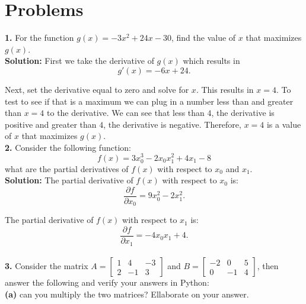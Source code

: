 \documentclass[a4paper]{article}
\begin{document}
\section{Problems}
\textbf{1.} For the function $g(x) = -3x^2 +24x -30$, find the value of $x$ that 
maximizes $g(x)$.\\

\textbf{Solution:} First we take the derivative of $g(x)$ which results in
\begin{equation*}
  g'(x) = -6x+24.
\end{equation*}

Next, set the derivative equal to zero and solve for $x$.  This results in $x=4$.  
To test to see if that is a maximum we can plug in a number less than and greater 
than $x=4$ to the derivative.  We can see that less than $4$, the derivative is positive 
and greater than $4$, the derivative is negative.  Therefore, $x=4$ is a value of $x$ 
that maximizes $g(x)$.\\
\textbf{2.} Consider the following function:
\begin{equation}
  f(x) = 3x_0^3 - 2x_0x_1^2 + 4x_1 - 8
\end{equation}
what are the partial derivatives of $f(x)$ with respect to $x_0$ and $x_1$.\\

\textbf{Solution:} The partial derivative of $f(x)$ with respect to $x_0$ is:
\begin{equation*}
  \frac{\partial f}{\partial x_0} = 9x_0^2-2x_1^2.
\end{equation*}

The partial derivative of $f(x)$ with respect to $x_1$ is:
\begin{equation*}
  \frac{\partial f}{\partial x_1} = -4x_0x_1+4.
\end{equation*}\\
\textbf{3.} Consider the matrix $A = 
\begin{bmatrix}
  1 & 4 & -3\\
  2 & -1 & 3
\end{bmatrix}$
and $B =
\begin{bmatrix}
  -2 & 0 & 5\\
  0 & -1 & 4
\end{bmatrix}$, then answer the following and verify your answers in Python:\\
\textbf{(a)} can you multiply the two matrices?  Ellaborate on your answer.\\
\end{document}
